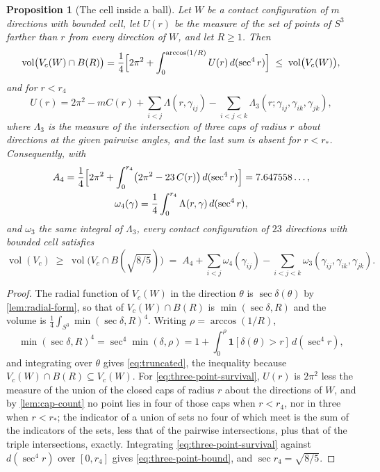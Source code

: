 \documentclass[11pt,reqno]{amsart}
\renewcommand{\_}{\origunderscore\allowbreak}
\numberwithin{equation}{section}
\theoremstyle{plain}
\newtheorem{prop}[thm]{Proposition}
\theoremstyle{definition}
\theoremstyle{remark}
\DeclareMathOperator{\vol}{vol}
\begin{document}
\begin{prop}[The cell inside a ball]\label{prop:truncated}
Let $W$ be a contact configuration of $m$ directions with bounded cell,
let $U(r)$ be the measure of the set of points of $S^3$ farther than $r$
from every direction of $W$, and let $R\ge1$. Then
\begin{equation}\label{eq:truncated}
  \vol\bigl(V_c(W)\cap B(R)\bigr)
  =\frac14\Bigl[2\pi^2+\int_0^{\arccos(1/R)}U(r)\,d(\sec^4r)\Bigr]
  \;\le\;\vol\bigl(V_c(W)\bigr),
\end{equation}
and for $r<r_4$
\begin{equation}\label{eq:three-point-survival}
  U(r)=2\pi^2-mC(r)+\sum_{i<j}\Lambda(r,\gamma_{ij})
       -\sum_{i<j<k}\Lambda_3(r;\gamma_{ij},\gamma_{ik},\gamma_{jk}),
\end{equation}
where $\Lambda_3$ is the measure of the intersection of three caps of
radius $r$ about directions at the given pairwise angles, and the last
sum is absent for $r<r_*$. Consequently, with
\[
\begin{gathered}
  A_4=\frac14\Bigl[2\pi^2+\int_0^{r_4}\bigl(2\pi^2-23\,C(r)\bigr)\,d(\sec^4r)\Bigr]
  =7.647558\ldots,\\
  \omega_4(\gamma)=\frac14\int_0^{r_4}\Lambda(r,\gamma)\,d(\sec^4r),
\end{gathered}
\]
and $\omega_3$ the same integral of $\Lambda_3$, every contact
configuration of $23$ directions with bounded cell satisfies
\begin{equation}\label{eq:three-point-bound}
  \vol(V_c)\;\ge\;\vol\bigl(V_c\cap B(\sqrt{8/5})\bigr)
  \;=\;A_4+\sum_{i<j}\omega_4(\gamma_{ij})
  -\sum_{i<j<k}\omega_3(\gamma_{ij},\gamma_{ik},\gamma_{jk}) .
\end{equation}
\end{prop}

\begin{proof}
The radial function of $V_c(W)$ in the direction $\theta$ is
$\sec\delta(\theta)$ by \cref{lem:radial-form}, so that of
$V_c(W)\cap B(R)$ is $\min(\sec\delta,R)$ and the volume is
$\tfrac14\int_{S^3}\min(\sec\delta,R)^4$. Writing $\rho=\arccos(1/R)$,
\[
  \min(\sec\delta,R)^4=\sec^4\min(\delta,\rho)
  =1+\int_0^{\rho}\mathbf 1[\delta(\theta)>r]\,d(\sec^4r),
\]
and integrating over $\theta$ gives \eqref{eq:truncated}, the inequality
because $V_c(W)\cap B(R)\subseteq V_c(W)$. For
\eqref{eq:three-point-survival}, $U(r)$ is $2\pi^2$ less the measure of
the union of the closed caps of radius $r$ about the directions of $W$,
and by \cref{lem:cap-count} no point lies in four of those caps when
$r<r_4$, nor in three when $r<r_*$; the indicator of a union of sets no
four of which meet is the sum of the indicators of the sets, less that
of the pairwise intersections, plus that of the triple intersections,
exactly. Integrating \eqref{eq:three-point-survival} against
$d(\sec^4r)$ over $[0,r_4]$ gives \eqref{eq:three-point-bound}, and
$\sec r_4=\sqrt{8/5}$.
\end{proof}
\end{document}
